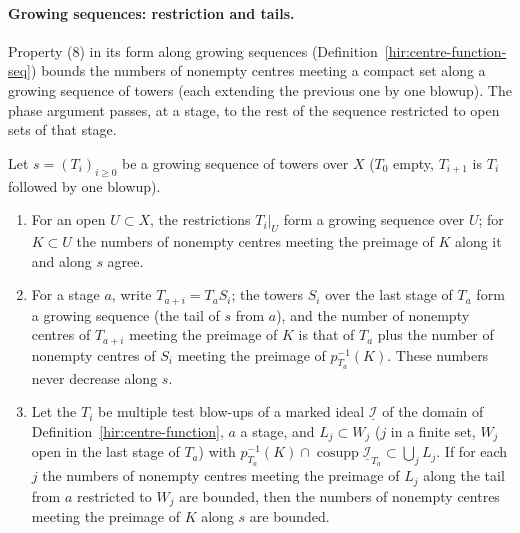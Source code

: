 \paragraph{Growing sequences: restriction and tails.} Property (8) in its form along growing sequences
(Definition~\ref{hir:centre-function-seq}) bounds the numbers of nonempty centres meeting a compact set along a growing sequence of towers (each extending the
previous one by one blowup). The phase argument passes, at a stage, to the rest of the sequence restricted to open sets of that stage.

\begin{lemma}
\label{bcalc:growing-seq-tail}
\mixedleanok
Let \(s=(T_i)_{i\ge0}\) be a growing sequence of towers over \(X\) (\(T_0\) empty, \(T_{i+1}\) is \(T_i\) followed by one blowup).
\begin{enumerate}
\item For an open \(U\subset X\), the restrictions \(T_i|_U\) form a growing sequence over \(U\); for \(K\subset U\) the numbers of nonempty centres meeting the
preimage of \(K\) along it and along \(s\) agree.
\item For a stage \(a\), write \(T_{a+i}=T_aS_i\); the towers \(S_i\) over the last stage of \(T_a\) form a growing sequence (the tail of \(s\) from \(a\)), and the number of
nonempty centres of \(T_{a+i}\) meeting the preimage of \(K\) is that of \(T_a\) plus the number of nonempty centres of \(S_i\) meeting the preimage of \(p_{T_a}^{-1}(K)\).
These numbers never decrease along \(s\).
\item Let the \(T_i\) be multiple test blow-ups of a marked ideal \(\underline{\mathcal I}\) of the domain of Definition~\ref{hir:centre-function}, \(a\) a stage, and
\(L_j\subset W_j\) (\(j\) in a finite set, \(W_j\) open in the last stage of \(T_a\)) with \(p_{T_a}^{-1}(K)\cap\operatorname{cosupp}\underline{\mathcal I}_{T_a}\subset\bigcup_jL_j\). If for
each \(j\) the numbers of nonempty centres meeting the preimage of \(L_j\) along the tail from \(a\) restricted to \(W_j\) are bounded, then the numbers of nonempty
centres meeting the preimage of \(K\) along \(s\) are bounded.
\end{enumerate}
\end{lemma}
